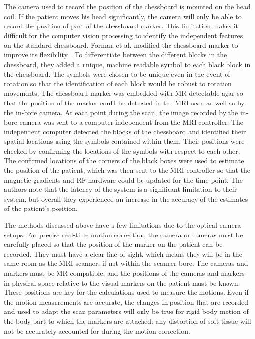 The camera used to record the position of the chessboard is mounted on the head coil. If the patient moves his head significantly, the camera will only be able to record the position of part of the chessboard marker. This limitation makes it difficult for the computer vision processing to identify the independent features on the standard chessboard. Forman et al. modified the chessboard marker to improve its flexibility \cite{Forman2011}. To differentiate between the different blocks in the chessboard, they added a unique, machine readable symbol to each black block in the chessboard. The symbols were chosen to be unique even in the event of rotation so that the identification of each block would be robust to rotation movements. The chessboard marker was embedded with MR-detectable agar so that the position of the marker could be detected in the MRI scan as well as by the in-bore camera. At each point during the scan, the image recorded by the in-bore camera was sent to a computer independent from the MRI controller. The independent computer detected the blocks of the chessboard and identified their spatial locations using the symbols contained within them. Their positions were checked by confirming the locations of the symbols with respect to each other. The confirmed locations of the corners of the black boxes were used to estimate the position of the patient, which was then sent to the MRI controller so that the magnetic gradients and RF hardware could be updated for the time point. The authors note that the latency of the system is a significant limitation to their system, but overall they experienced an increase in the accuracy of the estimates of the patient's position.

The methods discussed above have a few limitations due to the optical camera setups. For precise real-time motion correction, the camera or cameras must be carefully placed so that the position of the marker on the patient can be recorded. They must have a clear line of sight, which means they will be in the same room as the MRI scanner, if not within the scanner bore. The cameras and markers must be MR compatible, and the positions of the cameras and markers in physical space relative to the visual markers on the patient must be known. These positions are key for the calculations used to measure the motions. Even if the motion measurements are accurate, the changes in position that are recorded and used to adapt the scan parameters will only be true for rigid body motion of the body part to which the markers are attached: any distortion of soft tissue will not be accurately accounted for during the motion correction. 

